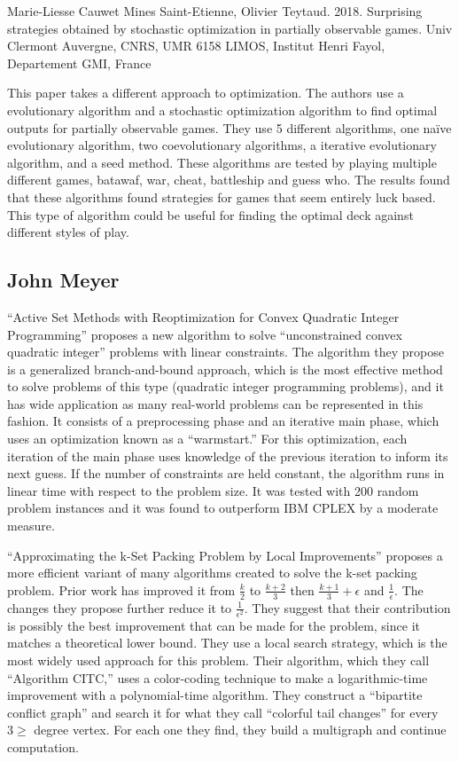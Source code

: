 \documentclass[12pt, letterpaper]{article}
\begin{document}
Marie-Liesse Cauwet Mines Saint-Etienne, Olivier Teytaud. 2018. Surprising strategies obtained by stochastic
optimization in partially observable games. Univ Clermont Auvergne, CNRS, UMR 6158 LIMOS, Institut Henri Fayol,
Departement GMI, France

This paper takes a different approach to optimization. The authors use a evolutionary algorithm and a stochastic
optimization algorithm to find optimal outputs for partially observable games. They use 5 different algorithms, one
naïve evolutionary algorithm, two coevolutionary algorithms, a iterative evolutionary algorithm, and a seed method.
These algorithms are tested by playing multiple different games, batawaf, war, cheat, battleship and guess who. The
results found that these algorithms found strategies for games that seem entirely luck based. This type of algorithm
could be useful for finding the optimal deck against different styles of play.

\subsection{John Meyer}

\enquote{Active Set Methods with Reoptimization for Convex Quadratic Integer Programming}
proposes a new algorithm to solve \enquote{unconstrained convex quadratic integer}
problems with linear constraints.
The algorithm they propose is a generalized branch-and-bound approach,
which is the most effective method to solve problems of this type (quadratic integer programming problems),
and it has wide application as many real-world problems can be represented in this fashion.
It consists of a preprocessing phase and an iterative main phase,
which uses an optimization known as a \enquote{warmstart.}
For this optimization,
each iteration of the main phase uses knowledge of the previous iteration to inform its next guess.
If the number of constraints are held constant,
the algorithm runs in linear time with respect to the problem size.
It was tested with 200 random problem instances and it was found to outperform IBM CPLEX by a moderate measure.

\enquote{Approximating the k-Set Packing Problem by Local Improvements}
proposes a more efficient variant of many algorithms created to solve the k-set packing problem.
Prior work has improved it from $ \frac{k}{2} $ to $ \frac{k + 2}{3} $
then $ \frac{k + 1}{3} + \epsilon $ and $ \frac{1}{\epsilon} $.
The changes they propose further reduce it to $ \frac{1}{\epsilon^2} $.
They suggest that their contribution is possibly the best improvement that can be made for the problem,
since it matches a theoretical lower bound.
They use a local search strategy,
which is the most widely used approach for this problem.
Their algorithm, which they call \enquote{Algorithm CITC,}
uses a color-coding technique to make a logarithmic-time improvement with a polynomial-time algorithm.
They construct a \enquote{bipartite conflict graph}
and search it for what they call \enquote{colorful tail changes} for every $ 3 \ge $ degree vertex.
For each one they find,
they build a multigraph and continue computation.
\end{document}
